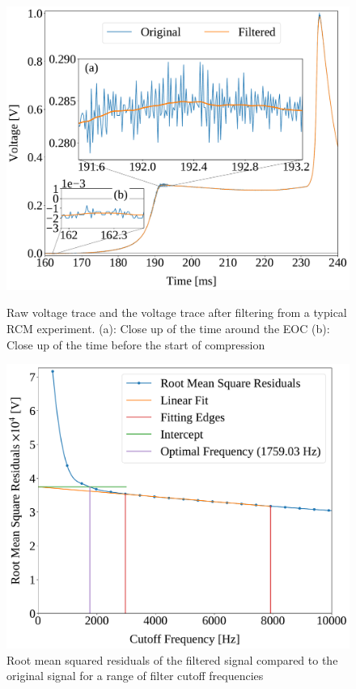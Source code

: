 \documentclass[12pt]{../ussci}
\begin{document}
\begin{figure}[htbp]
    \begin{minipage}[t]{0.48\textwidth}
        \centering
        \includegraphics[width=\linewidth]{figures/raw-voltage.pdf}
        \caption{Raw voltage trace and the voltage trace after filtering from a typical
        RCM experiment. (a): Close up of the
        time around the EOC (b): Close up of the time before the start of
        compression}
        \label{fig:raw-voltage}
    \end{minipage}\hfill%
    \begin{minipage}[t]{0.48\textwidth}
        \centering
        \includegraphics[width=\linewidth]{figures/residuals.pdf}
        \caption{Root mean squared residuals of the filtered signal compared to the
        original signal for a range of filter cutoff frequencies}
        \label{fig:residuals}
    \end{minipage}
\end{figure}
\end{document}
